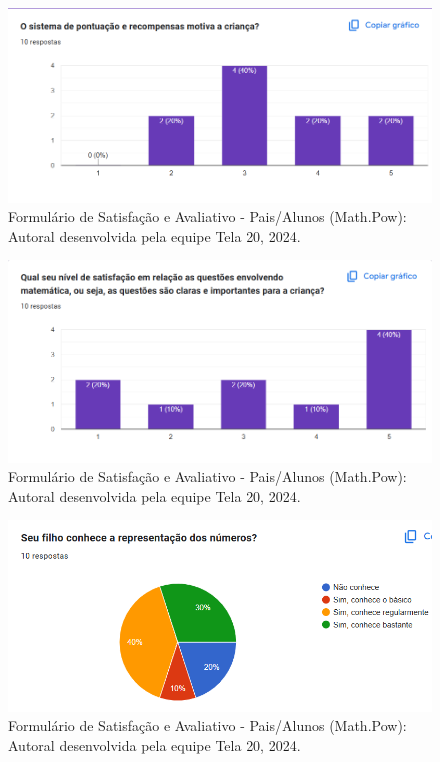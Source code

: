 \documentclass[12pt, openany, oneside, a4paper, english, brazil]{abntex2}   %
\begin{document}
\begin{figure}
    \centering
    \includegraphics[width=0.9\linewidth]{figuras/Formulário Gráficos/Pais/9 O sistema de pontuacao e recompensas motiva a crianca.png}
    \caption{Formulário de Satisfação e Avaliativo  - Pais/Alunos (Math.Pow):  Autoral desenvolvida pela equipe Tela 20, 2024.}
    \label{gráfico gerado pelo formulário}
\end{figure}

\begin{figure}
    \centering
    \includegraphics[width=0.9\linewidth]{figuras/Formulário Gráficos/Pais/10 qual o seu nivel de satistafacao em relacao as questoes envolvendo matematica.png}
    \caption{Formulário de Satisfação e Avaliativo  - Pais/Alunos (Math.Pow):  Autoral desenvolvida pela equipe Tela 20, 2024.}
    \label{gráfico gerado pelo formulário}
\end{figure}

\begin{figure}
    \centering
    \includegraphics{figuras/Formulário Gráficos/Pais/11 seu filho conhece a representação dos números.png}
    \caption{Formulário de Satisfação e Avaliativo  - Pais/Alunos (Math.Pow):  Autoral desenvolvida pela equipe Tela 20, 2024.}
    \label{gráfico gerado pelo formulário}
\end{figure}
\end{document}
